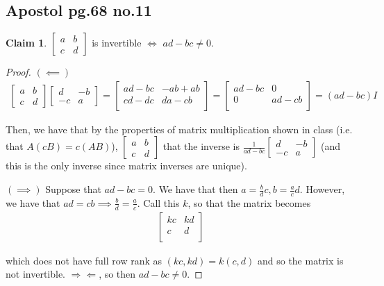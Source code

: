 \documentclass[12pt,letterpaper]{article}
\theoremstyle{definition}
\newtheorem*{claim}{Claim}
\newcommand{\contra}{\Rightarrow\!\Leftarrow}
\begin{document}
\subsection*{Apostol pg.68 no.11}

\begin{claim}
  $
  \begin{bmatrix}
    a & b \\
    c& d 
  \end{bmatrix}$ is invertible $\iff$ $ad - bc \neq 0$.
\end{claim}

\begin{proof}
  $(\impliedby)$
\begin{align*}
  \begin{bmatrix}
    a & b \\
    c& d 
  \end{bmatrix}
  \begin{bmatrix}
    d & -b \\
    -c & a 
  \end{bmatrix} =
         \begin{bmatrix}
           ad - bc & -ab + ab \\
           cd - dc & da - cb \\
         \end{bmatrix} = 
  \begin{bmatrix}
    ad - bc & 0 \\
    0 & ad - cb \\
  \end{bmatrix} = (ad - bc)I
\end{align*}

Then, we have that by the properties of matrix multiplication shown in class
(i.e. that $A(cB) = c(AB)$), 
$\begin{bmatrix}
  a & b \\ c & d
\end{bmatrix}$ that the inverse is
$\frac{1}{ad - bc}\begin{bmatrix}
  d & -b \\ -c & a 
\end{bmatrix}$ (and this is the only inverse since matrix inverses are unique).

$(\implies)$ Suppose that $ad - bc = 0$. We have that then
$a = \frac{b}{d}c, b = \frac{a}{c}d$. However, we have that $ad = cb \implies
\frac{b}{d} = \frac{a}{c}$. Call this $k$, so that the matrix becomes 
\begin{align*}
  \begin{bmatrix}
    kc & kd \\
    c & d \\
  \end{bmatrix}
\end{align*}

which does not have full row rank as $(kc, kd) = k(c, d)$ and so the matrix is
not invertible. $\contra$, so then $ad - bc \neq 0$.
\end{proof}
\end{document}
